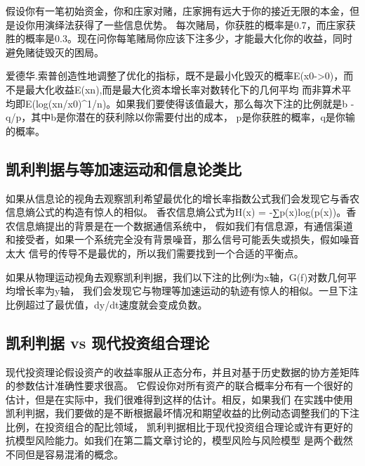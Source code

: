 \documentclass[
  oneside]{book}
\begin{document}
假设你有一笔初始资金，你和庄家对赌，庄家拥有远大于你的接近无限的本金，但是设你用演绎法获得了一些信息优势。
每次赌局，你获胜的概率是0.7，而庄家获胜的概率是0.3。现在问你每笔赌局你应该下注多少，才能最大化你的收益，同时避免赌徒毁灭的困局。

爱德华.索普创造性地调整了优化的指标，既不是最小化毁灭的概率E(x0-\textgreater0)，而不是最大化收益E(xn),而是最大化资本增长率对数转化下的几何平均
而非算术平均即E(log(xn/x0)\^{}1/n)。如果我们要使得该值最大，那么每次下注的比例就是b - q/p，其中b是你潜在的获利除以你需要付出的成本，
p是你获胜的概率，q是你输的概率。

\hypertarget{ux51efux5229ux5224ux636eux4e0eux7b49ux52a0ux901fux8fd0ux52a8ux548cux4fe1ux606fux8bbaux7c7bux6bd4}{%
\subsection{凯利判据与等加速运动和信息论类比}\label{ux51efux5229ux5224ux636eux4e0eux7b49ux52a0ux901fux8fd0ux52a8ux548cux4fe1ux606fux8bbaux7c7bux6bd4}}

如果从信息论的视角去观察凯利希望最优化的增长率指数公式我们会发现它与香农信息熵公式的构造有惊人的相似。
香农信息熵公式为H(x) = -∑p(x)log(p(x))。香农信息熵提出的背景是在一个数据通信系统中，
假如我们有信息源，有通信渠道和接受者，如果一个系统完全没有背景噪音，那么信号可能丢失或损失，假如噪音太大
信号的传导不是最优的，所以我们需要找到一个合适的平衡点。

如果从物理运动视角去观察凯利判据，我们以下注的比例f为x轴，G(f)对数几何平均增长率为y轴，
我们会发现它与物理等加速运动的轨迹有惊人的相似。一旦下注比例超过了最优值，dy/dt速度就会变成负数。

\hypertarget{ux51efux5229ux5224ux636e-vs-ux73b0ux4ee3ux6295ux8d44ux7ec4ux5408ux7406ux8bba}{%
\subsection{凯利判据 vs 现代投资组合理论}\label{ux51efux5229ux5224ux636e-vs-ux73b0ux4ee3ux6295ux8d44ux7ec4ux5408ux7406ux8bba}}

现代投资理论假设资产的收益率服从正态分布，并且对基于历史数据的协方差矩阵的参数估计准确性要求很高。
它假设你对所有资产的联合概率分布有一个很好的估计，但是在实际中，我们很难得到这样的估计。相反，如果我们
在实践中使用凯利判据，我们要做的是不断根据最坏情况和期望收益的比例动态调整我们的下注比例，在投资组合的配比领域，
凯利判据相比于现代投资组合理论或许有更好的抗模型风险能力。如我们在第二篇文章讨论的，模型风险与风险模型
是两个截然不同但是容易混淆的概念。
\end{document}
